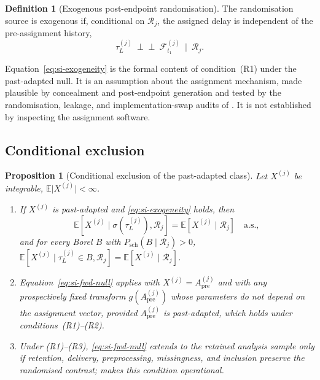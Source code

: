 \documentclass[11pt,a4paper]{article}
\newtheorem{proposition}{Proposition}
\theoremstyle{definition}
\newtheorem{definition}{Definition}
\newcommand{\F}{\mathcal{F}}
\newcommand{\Apre}{A_{\mathrm{pre}}}
\newcommand{\tauL}{\tau_L}
\begin{document}
\begin{definition}[Exogenous post-endpoint randomisation]
\label{def:exogenous}
The randomisation source is exogenous if, conditional on \(\mathcal{R}_j\), the
assigned delay is independent of the pre-assignment history,
\begin{equation}
\label{eq:si-exogeneity}
\tauL^{(j)}\ \perp\!\!\!\perp\ \F_{t_1}^{(j)}\ \mid\ \mathcal{R}_j .
\end{equation}
\end{definition}

Equation~\eqref{eq:si-exogeneity} is the formal content of condition~(R1) under
the past-adapted null. It is an assumption about the assignment mechanism, made
plausible by concealment and post-endpoint generation and tested by the
randomisation, leakage, and implementation-swap audits of
. It is not established by inspecting the
assignment software.

\subsection{Conditional exclusion}
\label{sec:si-exclusion-proof}

\begin{proposition}[Conditional exclusion of the past-adapted class]
\label{prop:si-exclusion}
Let \(X^{(j)}\) be integrable, \(\mathbb{E}\lvert X^{(j)}\rvert<\infty\).
\begin{enumerate}[leftmargin=2.0em,itemsep=2pt]
\item If \(X^{(j)}\) is past-adapted and \eqref{eq:si-exogeneity} holds, then
\begin{equation}
\label{eq:si-fwd-null}
\mathbb{E}\!\left[X^{(j)}\mid\sigma(\tauL^{(j)}),\mathcal{R}_j\right]
=\mathbb{E}\!\left[X^{(j)}\mid\mathcal{R}_j\right]\quad\text{a.s.},
\end{equation}
and for every Borel \(B\) with
\(P_{\mathrm{sch}}(B\mid\mathcal{R}_j)>0\),
\(\mathbb{E}[X^{(j)}\mid\tauL^{(j)}\in B,\mathcal{R}_j]
=\mathbb{E}[X^{(j)}\mid\mathcal{R}_j]\).
\item Equation~\eqref{eq:si-fwd-null} applies with \(X^{(j)}=\Apre^{(j)}\) and
with any prospectively fixed transform \(g(\Apre^{(j)})\) whose parameters do not
depend on the assignment vector, provided \(\Apre^{(j)}\) is past-adapted, which
holds under conditions~(R1)--(R2).
\item Under (R1)--(R3), \eqref{eq:si-fwd-null} extends to the retained analysis
sample only if retention, delivery, preprocessing, missingness, and inclusion
preserve the randomised contrast;  makes this
condition operational.
\end{enumerate}
\end{proposition}
\end{document}
